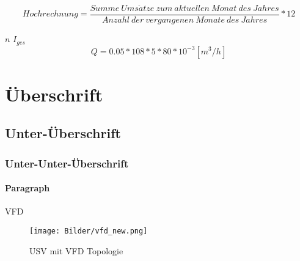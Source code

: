 

\begin{equation}
Hochrechnung =  \frac{Summe~Ums\ddot{a}tze~zum~aktuellen~Monat~des~Jahres}{Anzahl~der~vergangenen~Monate~des~Jahres}*12
\label{eq:eq1}
\end{equation}

$n$ %
$I_{ges}$
\[Q = 0.05 * 108 * 5 * 80 * 10^{-3}[m^3/h]\] %


\section{Überschrift}
\subsection{Unter-Überschrift}
\subsubsection{Unter-Unter-Überschrift}
\paragraph{Paragraph}


\cite{netz} %
\acf{VFD} %


\begin{figure}[ht]														%
\centering																		%
\texttt{[image: Bilder/vfd\_new.png]}		%
\caption[USV mit VFD Topologie]{USV mit VFD Topologie \cite{bild}}	%
\label{vfd}																		%
\end{figure}


